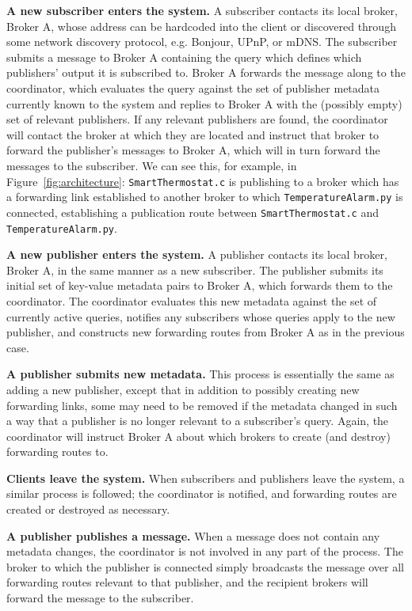 \textbf{A new subscriber enters the system.}
A subscriber contacts its local broker, Broker A, whose address can be hardcoded into the client or discovered through some network discovery protocol, e.g. Bonjour, UPnP, or mDNS.
The subscriber submits a message to Broker A containing the query which defines which publishers' output it is subscribed to.
Broker A forwards the message along to the coordinator, which evaluates the query against the set of publisher metadata currently known to the system and replies to Broker A with the (possibly empty) set of relevant publishers.
If any relevant publishers are found, the coordinator will contact the broker at which they are located and instruct that broker to forward the publisher's messages to Broker A, which will in turn forward the messages to the subscriber.
We can see this, for example, in Figure~\ref{fig:architecture}: \texttt{SmartThermostat.c} is publishing to a broker which has a forwarding link established to another broker to which \texttt{TemperatureAlarm.py} is connected, establishing a publication route between \texttt{SmartThermostat.c} and \texttt{TemperatureAlarm.py}.

\textbf{A new publisher enters the system.}
A publisher contacts its local broker, Broker A, in the same manner as a new subscriber.
The publisher submits its initial set of key-value metadata pairs to Broker A, which forwards them to the coordinator.
The coordinator evaluates this new metadata against the set of currently active queries, notifies any subscribers whose queries apply to the new publisher, and constructs new forwarding routes from Broker A as in the previous case.

\textbf{A publisher submits new metadata.}
This process is essentially the same as adding a new publisher, except that in addition to possibly creating new forwarding links, some may need to be removed if the metadata changed in such a way that a publisher is no longer relevant to a subscriber's query.
Again, the coordinator will instruct Broker A about which brokers to create (and destroy) forwarding routes to.

\textbf{Clients leave the system.}
When subscribers and publishers leave the system, a similar process is followed; the coordinator is notified, and forwarding routes are created or destroyed as necessary.

\textbf{A publisher publishes a message.}
When a message does not contain any metadata changes, the coordinator is not involved in any part of the process.
The broker to which the publisher is connected simply broadcasts the message over all forwarding routes relevant to that publisher, and the recipient brokers will forward the message to the subscriber.

